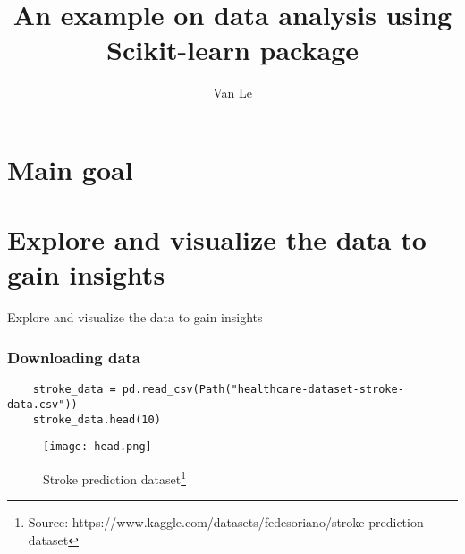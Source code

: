 \documentclass[10pt]{beamer}
\author[nle12@vols.utk.edu]{Van Le }
\institute[UTK] %
{
		Department of Mathematics\\
	The University of Tennessee, Knoxville\\

}
\theoremstyle{definition}
\theoremstyle{remark}
\numberwithin{equation}{section}
\begin{document}
	\title[Introduction to machine learning]{An example on data analysis using Scikit-learn package}
	\frame{\titlepage}
	\frame
	{
			\tableofcontents
	}


\section{Main goal}

\section{Explore and visualize the data to gain insights}
\begin{frame}
	\centering \large Explore and visualize the data to gain insights
\end{frame}

\begin{frame}[fragile]
	\frametitle{Downloading data}
\begin{lstlisting}
	stroke_data = pd.read_csv(Path("healthcare-dataset-stroke-data.csv"))
	stroke_data.head(10)
\end{lstlisting}

\begin{figure}[h]
	\caption{Stroke prediction dataset\footnote{Source: https://www.kaggle.com/datasets/fedesoriano/stroke-prediction-dataset}}
	\centering
	\texttt{[image: head.png]}
\end{figure}



\end{frame}
\end{document}
